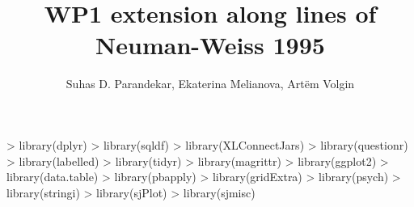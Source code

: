 \documentclass[12pt,a4paper]{article}
\begin{document}


\title{WP1 extension along lines of Neuman-Weiss 1995}
\author{Suhas D. Parandekar, Ekaterina Melianova, Art\"{e}m Volgin}
\maketitle

\begin{Schunk}
\begin{Sinput}
> library(dplyr)
> library(sqldf)
> library(XLConnectJars)
> library(questionr)
> library(labelled)
> library(tidyr)
> library(magrittr)
> library(ggplot2)
> library(data.table)
> library(pbapply)
> library(gridExtra)
> library(psych)
> library(stringi)
> library(sjPlot)
> library(sjmisc)
\end{Sinput}
\end{Schunk}
\end{document}
